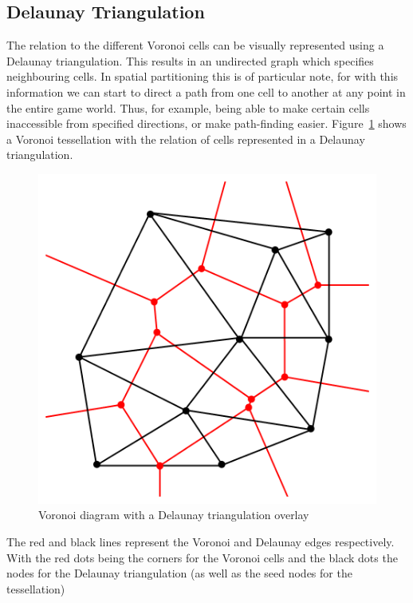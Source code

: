 \documentclass[11pt,a4paper,twocolumn]{article}
\begin{document}
\subsection{Delaunay Triangulation}
The relation to the different Voronoi cells can be visually represented using a Delaunay triangulation. This results in an undirected graph which specifies neighbouring cells. In spatial partitioning this is of particular note, for with this information we can start to direct a path from one cell to another at any point in the entire game world. Thus, for example, being able to make certain cells inaccessible from specified directions, or make path-finding easier. Figure~\ref{fig:voronoidelaunay} shows a Voronoi tessellation with the relation of cells represented in a Delaunay triangulation. 
\begin{figure}[b]{}
\centering
	\includegraphics[scale=0.25]{images/Delaunay_Voronoi}
	\caption{Voronoi diagram with a Delaunay triangulation overlay \cite{delaunaywiki}} 
\label{fig:voronoidelaunay}
\end{figure}
The red and black lines represent the Voronoi and Delaunay edges respectively. With the red dots being the corners for the Voronoi cells and the black dots the nodes for the Delaunay triangulation {(as well as the seed nodes for the tessellation)}
\end{document}
